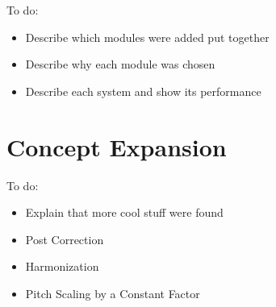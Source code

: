 \color{red}
To do:
\begin{itemize}
	\item Describe which modules were added put together
	\item Describe why each module was chosen
	\item Describe each system and show its performance
\end{itemize}
\color{black}

\section{Concept Expansion}

\color{red}
To do:
\begin{itemize}
	\item Explain that more cool stuff were found
	\item Post Correction
	\item Harmonization
	\item Pitch Scaling by a Constant Factor
\end{itemize}
\color{black}
